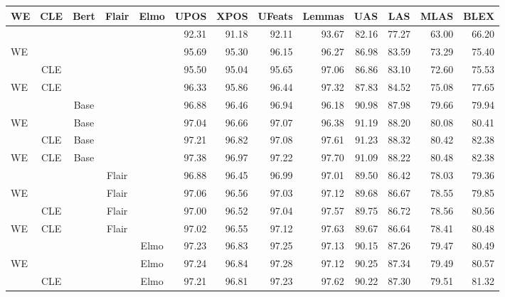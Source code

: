 \documentclass[11pt,a4paper]{article}
\begin{document}
\begin{table*}[t]
  \begin{center}
\setlength{\tabcolsep}{4pt}
    \begin{tabular}{l|c|c|c|c||r|r|r|r|r|r|r|r}
\multicolumn{1}{c|}{WE} & \multicolumn{1}{c|}{CLE} & \multicolumn{1}{c|}{Bert} & \multicolumn{1}{c|}{Flair} & \multicolumn{1}{c||}{Elmo} & \multicolumn{1}{c|}{UPOS} & \multicolumn{1}{c|}{XPOS} & \multicolumn{1}{c|}{UFeats} & \multicolumn{1}{c|}{Lemmas} & \multicolumn{1}{c|}{UAS} & \multicolumn{1}{c|}{LAS} & \multicolumn{1}{c|}{MLAS} & \multicolumn{1}{c}{BLEX}\\\hline\hline
 &  &  &  &  & 92.31 & 91.18 & 92.11 & 93.67 & 82.16 & 77.27 & 63.00 & 66.20\\\hline
WE &  &  &  &  & 95.69 & 95.30 & 96.15 & 96.27 & 86.98 & 83.59 & 73.29 & 75.40\\\hline
 & CLE &  &  &  & 95.50 & 95.04 & 95.65 & 97.06 & 86.86 & 83.10 & 72.60 & 75.53\\\hline
WE & CLE &  &  &  & 96.33 & 95.86 & 96.44 & 97.32 & 87.83 & 84.52 & 75.08 & 77.65\\\hline
\hline
 &  & Base &  &  & 96.88 & 96.46 & 96.94 & 96.18 & 90.98 & 87.98 & 79.66 & 79.94\\\hline
WE &  & Base &  &  & 97.04 & 96.66 & 97.07 & 96.38 & 91.19 & 88.20 & 80.08 & 80.41\\\hline
 & CLE & Base &  &  & 97.21 & 96.82 & 97.08 & 97.61 & 91.23 & 88.32 & 80.42 & 82.38\\\hline
WE & CLE & Base &  &  & 97.38 & 96.97 & 97.22 & 97.70 & 91.09 & 88.22 & 80.48 & 82.38\\\hline
\hline
 &  &  & Flair &  & 96.88 & 96.45 & 96.99 & 97.01 & 89.50 & 86.42 & 78.03 & 79.36\\\hline
WE &  &  & Flair &  & 97.06 & 96.56 & 97.03 & 97.12 & 89.68 & 86.67 & 78.55 & 79.85\\\hline
 & CLE &  & Flair &  & 97.00 & 96.52 & 97.04 & 97.57 & 89.75 & 86.72 & 78.56 & 80.56\\\hline
WE & CLE &  & Flair &  & 97.02 & 96.55 & 97.12 & 97.63 & 89.67 & 86.64 & 78.41 & 80.48\\\hline
\hline
 &  &  &  & Elmo & 97.23 & 96.83 & 97.25 & 97.13 & 90.15 & 87.26 & 79.47 & 80.49\\\hline
WE &  &  &  & Elmo & 97.24 & 96.84 & 97.28 & 97.12 & 90.25 & 87.34 & 79.49 & 80.57\\\hline
 & CLE &  &  & Elmo & 97.21 & 96.81 & 97.23 & 97.62 & 90.22 & 87.30 & 79.51 & 81.32\\\hline

\end{tabular}
\end{center}
\end{table*}
\end{document}

